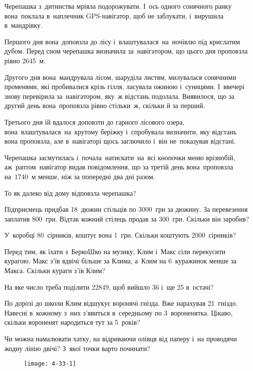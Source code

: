 \problem
Черепашка з~дитинства мріяла подорожувати. І~ось одного сонячного ранку
вона поклала в~наплечник GPS-навігатор, щоб не заблукати,
і~вирушила в~мандрівку.

Першого дня вона доповзла до лісу і~влаштувалася на ночівлю під крислатим
дубом. Перед сном черепашка визначила за навігатором, що цього дня
проповзла рівно 2645~м.

Другого дня вона мандрувала лісом, шаруділа листям, милувалася сонячними
променями, які пробивалися крізь гілля, ласувала ожиною і~суницями.
І~ввечері знову перевірила за навігатором, яку~ж відстань подолала.
Виявилося, що за другий день вона проповзла рівно стільки~ж,
скільки й за перший.

Третього дня їй вдалося доповзти до гарного лісового озера,
вона влаштувалася на крутому беріжку і~спробувала визначити,
яку відстань вона проповзла, але в~навігаторі щось заглючило
і~він не~показував відстані.

Черепашка засмутилась і~почала натискати на всі кнопочки меню врізнобій,
аж~раптом навігатор видав повідомлення, що за третій день вона проповзла
на 1740~м менше, ніж за попередні два дні разом.

То як далеко від дому відповзла черепашка?


\problem
Підприємець придбав 18~дюжин стільців по 3000~грн за дюжину.
За перевезення заплатив 800~грн.
Відтак кожний стілець продав за 300~грн.
Скільки він заробив?


\problem
У~коробці 80~сірників, коштує вона 1~грн.
Скільки коштують 2000~сірників?


\problem
Перед тим, як їхати з~БеркоШко на музику, Клим і~Макс сіли перекусити курагою.
Макс з’їв вдвічі більше за Клима, а~Клим на 6~куражинок менше за Макса.
Скільки кураги з’їв Клим?


\problem
На яке число треба поділити 22849, щоб вийшло 36 і~ще 25 в~остачі?


\problem
По дорозі до школи Клим відшукує воронячі гнізда. Вже нарахував 21~гніздо.
Навесні в~кожному з~них з’явиться в~середньому по 3~вороненятка.
Цікаво, скільки вороненят народиться тут за 5~років?


\problem
Чи можна намалювати хатку, на відриваючи олівця від паперу і~на проводячи
жодну лінію двічі?
З~якої точки варто починати?

\begin{figure}[h]
    \centering
    \texttt{[image: 4-33-1]}
\end{figure}


